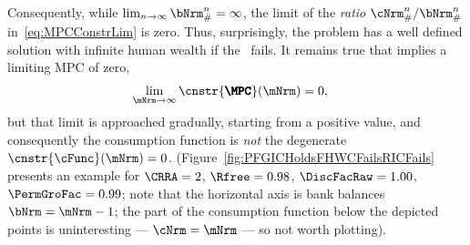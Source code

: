 \documentclass[\econtexRoot/BufferStockTheory]{subfiles}
\begin{document}
Consequently, while $\lim_{n \rightarrow \infty} \bNrm_{\#}^{n} = \infty$, the limit of the \textit{ratio} $\cNrm_{\#}^{n}/\bNrm_{\#}^{n}$ in~\eqref{eq:MPCConstrLim} is zero.
Thus, surprisingly, the problem has a well defined solution with
infinite human wealth if the \RIC~fails.
It remains true that \cncl{\RIC}
implies a limiting MPC of zero,
\begin{equation}\begin{gathered}\begin{aligned}
  \lim_{\mNrm \rightarrow \infty} \cnstr{\pmb{\MPC}}(\mNrm)   & = 0,
\end{aligned}\end{gathered}\end{equation}
but that limit is approached gradually, starting from a positive value, and consequently the consumption function is \textit{not} the degenerate $\cnstr{\cFunc}(\mNrm)=0$.
(Figure~\ref{fig:PFGICHoldsFHWCFailsRICFails} presents an example for $\CRRA=2$, $\Rfree=0.98$, $\DiscFacRaw = 1.00$, $\PermGroFac = 0.99$; note that the horizontal axis is bank balances $\bNrm = \mNrm-1$; the part of the consumption function below the depicted points is uninteresting --- $\cNrm = \mNrm$ --- so not worth plotting).



\end{document}
